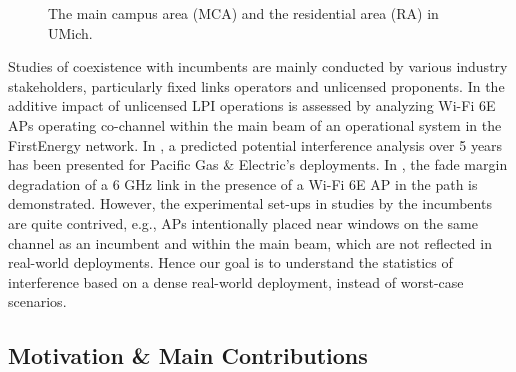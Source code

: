 \documentclass[sigconf,10pt]{acmart}
\begin{document}
\begin{figure*}
     \centering
     \begin{subfigure}[Wi-Fi deployment at UMich. Green Pins: Buildings with Wi-Fi 6E LPI APs.]{  \centering
    \texttt{[image: Figures/wifi\_deployment2.png]}
         \label{Fig:wifi_deployment}}
    \end{subfigure}
     \begin{subfigure}[Driving and walking meas. in the MCA. Red Pins: Driving, Blue Pins: Walking.]{
         \centering
\texttt{[image: Figures/main\_campus\_walking\_driving.png]}
        \label{Fig:reg_campus1}}
     \end{subfigure} 
     \begin{subfigure}[6 GHz fixed links. Orange: drone meas. locations, Blue: Tx locations, Red: Rx location.]{
         \centering
\texttt{[image: Figures/6ghz\_fixed\_links2.png]}
        \label{Fig:reg_campus2}}
     \end{subfigure}
    \vspace{-1em}
    \caption{The main campus area (MCA) and the residential area (RA) in UMich.}
    \label{Fig:meas_locs}
    \vspace{-1em}
\end{figure*}

Studies of coexistence with incumbents are mainly conducted by various industry stakeholders, particularly fixed links operators and unlicensed proponents. 
In \cite{epri1, epri} the additive impact of unlicensed LPI operations is assessed by analyzing Wi-Fi 6E APs operating co-channel within the main beam of an operational 
system in the FirstEnergy network. In \cite{pge}, a predicted potential interference analysis over 5 years has been presented for Pacific Gas \& Electric’s deployments. In \cite{evergy, evergy2}, the fade margin degradation of a 6 GHz link in the presence of a Wi-Fi 6E AP in the path is demonstrated. However, the experimental set-ups in studies by the incumbents are quite contrived, e.g., APs intentionally placed near windows on the same channel as an incumbent and within the main beam, which are not reflected in real-world deployments. Hence our goal is to understand the statistics of interference based on a dense real-world deployment, instead of worst-case scenarios.

\subsection{Motivation \& Main Contributions}
\end{document}
